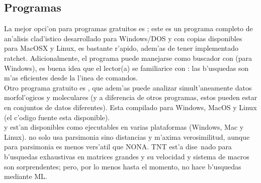\subsection{Programas}
\noindent
La mejor opci'on para programas gratuitos es ; este es un programa
completo de an'alisis clad'istico desarrollado para Windows/DOS y con copias
disponibles para MacOSX y Linux,  es bastante r'apido, adem'as de tener
implementado ratchet. Adicionalmente, el programa puede manejarse como buscador
con  (para Windows), es buena idea que el lector(a) se
familiarice con : las b'usquedas son m'as eficientes desde la l'inea
de comandos.\\
Otro programa gratuito es , que adem'as puede analizar
simult'aneamente datos morfol'ogicos y moleculares (y a diferencia de otros
programas, estos pueden estar en conjuntos de datos diferentes). Esta compilado
para Windows, MacOS y Linux (el c'odigo fuente esta disponible).\\
 y  est'an disponibles como ejecutables en varias
plataformas (Windows, Mac y Linux).  no solo usa parsimonia sino
distancias y m'axima verosimilitud, aunque para parsimonia es menos vers'atil
que NONA. TNT est'a dise~nado para b'usquedas exhaustivas en matrices grandes y
su velocidad y sistema de macros son sorprendentes; pero, por lo menos hasta el
momento, no hace b'usquedas mediante ML.

